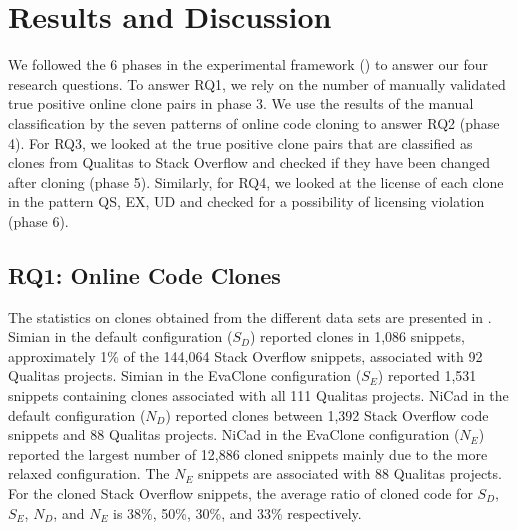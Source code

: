 \documentclass[sigconf,review, anonymous]{acmart}
\newcommand\FIXME[1]{\textbf{FIXME: #1}}
\begin{document}
\section{Results and Discussion}

We followed the 6 phases in the experimental framework ()
to answer our four research questions. 
To answer RQ1, we rely on the number of manually validated true positive online clone pairs
in phase 3. We use the results of the manual classification by the
seven patterns of online code cloning to answer RQ2 (phase 4). 
For RQ3, we looked at the true positive clone pairs that are classified 
as clones from Qualitas to Stack Overflow and
checked if they have been changed after cloning (phase 5). Similarly, for RQ4, we looked at the license of each clone in the pattern 
QS, EX, UD and checked for a possibility of licensing violation (phase 6).

\subsection{RQ1: Online Code Clones} 

The statistics on clones obtained from the different data sets are
presented in . Simian in the default configuration
($S_D$) reported clones in 1,086 snippets, approximately 1\% of the
144,064 Stack Overflow snippets, associated with 92 Qualitas
projects. Simian in the EvaClone configuration ($S_E$) reported 1,531
snippets containing clones associated with all 111 Qualitas
projects. NiCad in the default configuration ($N_D$) reported clones
between 1,392 Stack Overflow code snippets and 88 Qualitas
projects. NiCad in the EvaClone configuration ($N_E$) reported the
largest number of 12,886 cloned snippets mainly due to the more
relaxed configuration. The $N_E$ snippets are associated with 88
Qualitas projects.  For the cloned Stack Overflow snippets, the
average ratio of cloned code for $S_D$, $S_E$, $N_D$, and $N_E$ is
38\%, 50\%, 30\%, and 33\% respectively.

\end{document}
